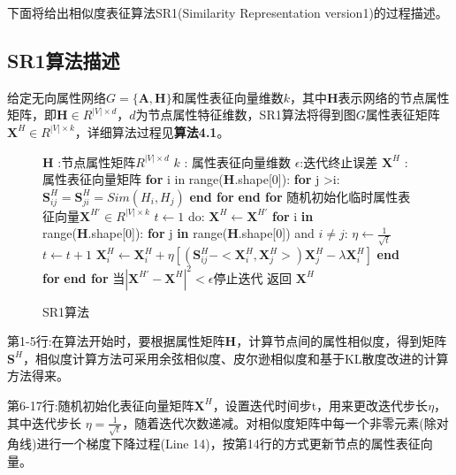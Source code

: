 下面将给出相似度表征算法SR1(Similarity Representation version1)的过程描述。
\subsection{SR1算法描述}
给定无向属性网络$G=\{\textbf{A}, \textbf{H}\}$和属性表征向量维数$k$，其中$\textbf{H}$表示网络的节点属性矩阵，即$\textbf{H}\in R^{|V|\times d}$，$d$为节点属性特征维数，SR1算法将得到图$G$属性表征矩阵$\textbf{X}^H\in R^{|V|\times k}$，详细算法过程见\textbf{算法4.1}。
\begin{figure}[htb]
	\centering
	\begin{minipage}{.7\linewidth}
		\begin{algorithm}[H]
			\small
			\caption{SR1算法}
			\begin{algorithmic}[1]
				\Require
				\Statex $\textbf{H}$ :节点属性矩阵$R^{|V|\times d}$
				\Statex $k$ : 属性表征向量维数
				\Statex $\epsilon$:迭代终止误差
				\Ensure
				\Statex $\textbf{X}^H$ :属性表征向量矩阵
				\Statex
				\State \textbf{for} i in range(\textbf{H}.shape[0]):
				\State \quad \textbf{for} j >i:
				\State\qquad	$\textbf{S}^H_{ij}=\textbf{S}^H_{ji} = Sim(H_i, H_j)$
				\State \quad \textbf{end for}
				\State \textbf{end for}
				\State 随机初始化临时属性表征向量$\textbf{X}^{H\prime}\in R^{|V|\times k}$
				\State $t \leftarrow 1$
				\State do:
				\State \quad $\textbf{X}^H\leftarrow\textbf{X}^{H\prime}$
				\State\quad \textbf{for} i \textbf{in} range(\textbf{H}.shape[0]):
				\State\qquad \textbf{for} j \textbf{in} range(\textbf{H}.shape[0]) and $i\ne j$:
				\State\quad \qquad $\eta \leftarrow \frac{1}{\sqrt{t}}$
				\State\quad \qquad $t\leftarrow t+1$
				\State\quad \qquad $\textbf{X}^H_i \leftarrow \textbf{X}^H_i + \eta [(\textbf{S}^H_{ij}-<\textbf{X}^H_i, \textbf{X}^H_j>)\textbf{X}^H_j - \lambda \textbf{X}^H_i]$
				\State \qquad \textbf{end for}
				\State \quad \textbf{end for}
				\State 当$|\textbf{X}^{H\prime}-\textbf{X}^H|^2<\epsilon$停止迭代
				\State 返回 $\textbf{X}^H$
			\end{algorithmic}
		\end{algorithm}
	\end{minipage}
\end{figure}

第1-5行:在算法开始时，要根据属性矩阵$\textbf{H}$，计算节点间的属性相似度，得到矩阵$\textbf{S}^H$，相似度计算方法可采用余弦相似度、皮尔逊相似度和基于KL散度改进的计算方法得来。

第6-17行:随机初始化表征向量矩阵$\textbf{X}^H$，设置迭代时间步t，用来更改迭代步长$\eta$，其中迭代步长 $\eta = \frac{1}{\sqrt{t}}$，随着迭代次数递减。对相似度矩阵中每一个非零元素(除对角线)进行一个梯度下降过程(Line 14)，按第14行的方式更新节点的属性表征向量。

